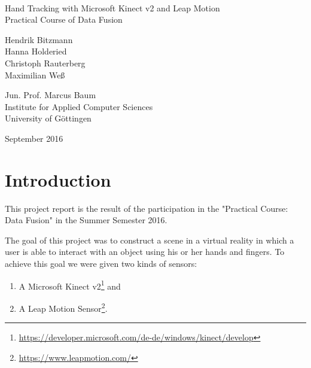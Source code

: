 \documentclass[11pt,a4paper,oldfontcommands, oneside]{memoir}
\begin{document}
%
%
\thispagestyle{empty}

{%
\sffamily
\centering
\Large

~\vspace{\fill}

{\huge 
Hand Tracking with Microsoft Kinect v2 and Leap Motion\\
}
\vspace{1.5cm}
{\Large
Practical Course of Data Fusion}



\vspace{5cm}

{\large
Hendrik Bitzmann \\
Hanna Holderied \\
Christoph Rauterberg \\
Maximilian Weß
}


\vspace{\fill}
Jun. Prof. Marcus Baum\\
Institute for Applied Computer Sciences\\
University of G\"ottingen


September 2016

}%

\cleardoublepage

\tableofcontents*




\chapter{Introduction}
This project report is the result of the participation in the "Practical Course: Data Fusion" in the Summer Semester 2016.


The goal of this project was to construct a scene in a virtual reality in which a user is able to interact with an object using his or her hands and fingers. To achieve this goal we were given two kinds of sensors:
\begin{enumerate}
	\item A Microsoft Kinect v2\footnote{\url{https://developer.microsoft.com/de-de/windows/kinect/develop}} and
	\item A Leap Motion Sensor\footnote{\url{https://www.leapmotion.com/}}.
\end{enumerate}
\end{document}
